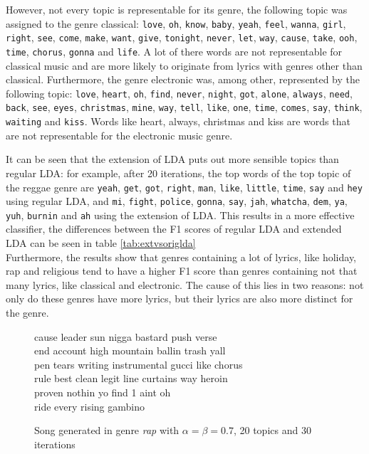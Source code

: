 However, not every topic is representable for its genre, the following topic was assigned to the genre classical: \verb|love|, \verb|oh|, \verb|know|, \verb|baby|, \verb|yeah|, \verb|feel|, \verb|wanna|, \verb|girl|, \verb|right|, \verb|see|, \verb|come|, \verb|make|, \verb|want|, \verb|give|, \verb|tonight|, \verb|never|, \verb|let|, \verb|way|, \verb|cause|, \verb|take|, \verb|ooh|, \verb|time|, \verb|chorus|, \verb|gonna| and \verb|life|. A lot of there words are not representable for classical music and are more likely to originate from lyrics with genres other than classical. Furthermore, the genre electronic was, among other, represented by the following topic: \verb|love|, \verb|heart|, \verb|oh|, \verb|find|, \verb|never|, \verb|night|, \verb|got|, \verb|alone|, \verb|always|, \verb|need|, \verb|back|, \verb|see|, \verb|eyes|, \verb|christmas|, \verb|mine|, \verb|way|, \verb|tell|, \verb|like|, \verb|one|, \verb|time|, \verb|comes|, \verb|say|, \verb|think|, \verb|waiting| and \verb|kiss|. Words like heart, always, christmas and kiss are words that are not representable for the electronic music genre.


\label{tab:onetable}




It can be seen that the extension of LDA puts out more sensible topics than regular LDA: for example, after 20 iterations, the top words of the top topic of the reggae genre are \verb|yeah|, \verb|get|, \verb|got|, \verb|right|, \verb|man|, \verb|like|, \verb|little|, \verb|time|, \verb|say| and \verb|hey| using regular LDA, and \verb|mi|, \verb|fight|, \verb|police|, \verb|gonna|, \verb|say|, \verb|jah|, \verb|whatcha|, \verb|dem|, \verb|ya|, \verb|yuh|, \verb|burnin| and \verb|ah| using the extension of LDA. This results in a more effective classifier, the differences between the F1 scores of regular LDA and extended LDA can be seen in table \ref{tab:extvsoriglda} \\
Furthermore, the results show that genres containing a lot of lyrics, like holiday, rap and religious tend to have a higher F1 score than genres containing not that many lyrics, like classical and electronic. The cause of this lies in two reasons: not only do these genres have more lyrics, but their lyrics are also more distinct for the genre. 




\begin{figure}
\begin{mdframed}
cause leader sun nigga bastard push verse \\
end account high mountain ballin trash yall \\
pen tears writing instrumental gucci like chorus \\
rule best clean legit line curtains way heroin \\
proven nothin yo find 1 aint oh \\
ride every rising gambino
\caption{Song generated in genre \textit{rap} with $\alpha=\beta=0.7$, 20 topics and 30 iterations}
 \end{mdframed}
\label{text:rap_song}
\end{figure}